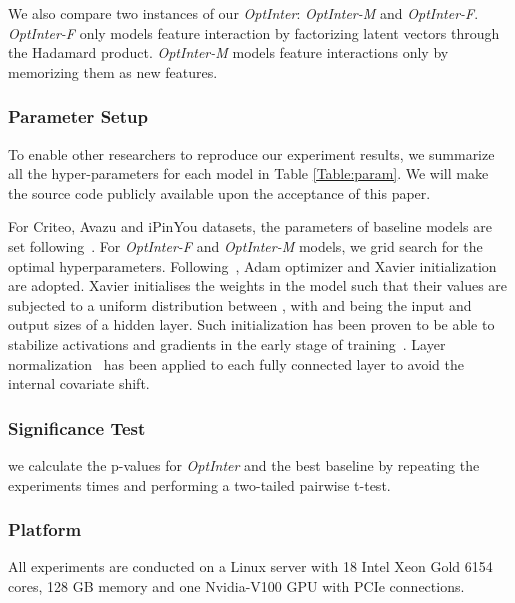 \documentclass[conference]{IEEEtran}
\begin{document}

We also compare  two instances of our \textit{OptInter}: \textit{OptInter-M} and \textit{OptInter-F}. \textit{OptInter-F} only models feature interaction by factorizing latent vectors through the Hadamard product. \textit{OptInter-M} models feature interactions only by memorizing them as new features. 

\subsubsection{Parameter Setup}

To enable other researchers to reproduce our experiment results, we summarize all the hyper-parameters for each model in Table \ref{Table:param}. We will make the source code publicly available upon the acceptance of this paper.

For Criteo, Avazu and iPinYou datasets, the parameters of baseline models are set following~\cite{PNN19}. For \textit{OptInter-F} and \textit{OptInter-M} models, we grid search for the optimal hyperparameters. Following~\cite{PNN19}, Adam optimizer and Xavier initialization~\cite{Xavier} are adopted. Xavier initialises the weights in the model such that their values are subjected to a uniform distribution between ,  with  and  being the input and output sizes of a hidden layer. Such initialization has been proven to be able to stabilize activations and gradients in the early stage of training~\cite{PNN19}. Layer normalization~\cite{LayerNorm} has been applied to each fully connected layer to avoid the internal covariate shift.

\subsubsection{Significance Test}  
we calculate the p-values for \textit{OptInter} and the best baseline by repeating the experiments  times and performing a two-tailed pairwise t-test.

\subsubsection{Platform}
All experiments are conducted on a Linux server with 18 Intel Xeon Gold 6154 cores, 128 GB memory and one Nvidia-V100 GPU with PCIe connections.
\end{document}
